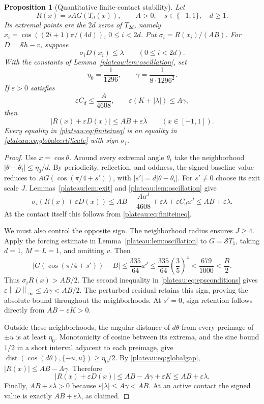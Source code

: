 \documentclass[11pt]{article}
\newtheorem{proposition}[theorem]{Proposition}
\theoremstyle{remark}\newtheorem{remark}[theorem]{Remark}
\newcommand{\norm}[1]{\left\lVert #1\right\rVert_\infty}
\newcommand{\eps}{\varepsilon}
\newcommand{\dist}{\operatorname{dist}}
\begin{document}
\begin{proposition}[Quantitative finite-contact stability]\label{plateau:prop:stability}
Let
\[
 R(x)=sA G(T_d(x)),\qquad A>0,\quad s\in\{-1,1\},\quad d\ge1.
\]
Its extremal points are the $2d$ zeros of $T_{2d}$, namely
$x_i=\cos((2i+1)\pi/(4d))$, $0\le i<2d$. Put
$\sigma_i=R(x_i)/(AB)$. For $D=\mathcal S h-v$, suppose
\begin{equation}\label{plateau:eq:finiteineq}
 \sigma_iD(x_i)\le\lambda\qquad(0\le i<2d).
\end{equation}
With the constants of Lemma~\ref{plateau:lem:oscillation}, set
\[
 \eta_0=\frac1{1296},\qquad
 \gamma=\frac1{8\cdot1296^2}.
\]
If $\eps>0$ satisfies
\begin{equation}\label{plateau:eq:epsconditions}
 \eps C_d\le\frac{A}{4608},\qquad
 \eps(K+|\lambda|)\le A\gamma,
\end{equation}
then
\begin{equation}\label{plateau:eq:globalcertificate}
 |R(x)+\eps D(x)|\le AB+\eps\lambda\qquad(x\in[-1,1]).
\end{equation}
Every equality in \eqref{plateau:eq:finiteineq} is an equality in
\eqref{plateau:eq:globalcertificate} with sign $\sigma_i$.
\end{proposition}
\begin{proof}
Use $x=\cos\theta$. Around every extremal angle $\theta_i$ take the
neighborhood $|\theta-\theta_i|\le\eta_0/d$. By periodicity, reflection,
and oddness, the signed baseline value reduces to
$AG(\cos(\pi/4+s'))$, with $|s'|=d|\theta-\theta_i|$.
For $s'\ne0$ choose its exit scale $J$. Lemmas~\ref{plateau:lem:exit} and
\ref{plateau:lem:oscillation} give
\[
 \sigma_i(R(x)+\eps D(x))
 \le AB-\frac{A a^J}{4608}+\eps\lambda+\eps C_d a^J
 \le AB+\eps\lambda.
\]
At the contact itself this follows from \eqref{plateau:eq:finiteineq}.

We must also control the opposite sign. The neighborhood radius ensures
$J\ge4$. Apply the forcing estimate in Lemma~\ref{plateau:lem:oscillation} to
$G=\mathcal S T_1$, taking $d=1$, $M=L=1$, and omitting $v$. Then
\[
 |G(\cos(\pi/4+s'))-B|
 \le\frac{335}{64}a^J
 \le\frac{335}{64}\left(\frac35\right)^4
 <\frac{679}{1000}<\frac B2.
\]
Thus $\sigma_iR(x)>AB/2$. The second inequality in
\eqref{plateau:eq:epsconditions} gives $\eps\norm D\le A\gamma<AB/2$.
The perturbed residual retains this sign, proving the absolute bound
throughout the neighborhoods. At $s'=0$, sign retention follows directly
from $AB-\eps K>0$.

Outside these neighborhoods, the angular distance of $d\theta$ from
every preimage of $\pm u$ is at least $\eta_0$. Monotonicity of cosine
between its extrema, and the sine bound $1/2$ in a short interval adjacent
to each preimage, give
$\dist(\cos(d\theta),\{-u,u\})\ge\eta_0/2$.
By \eqref{plateau:eq:globalgap}, $|R(x)|\le AB-A\gamma$. Therefore
\[
 |R(x)+\eps D(x)|\le AB-A\gamma+\eps K\le AB+\eps\lambda.
\]
Finally, $AB+\eps\lambda>0$ because
$\eps|\lambda|\le A\gamma<AB$. At an active contact the signed value
is exactly $AB+\eps\lambda$, as claimed.
\end{proof}
\end{document}
